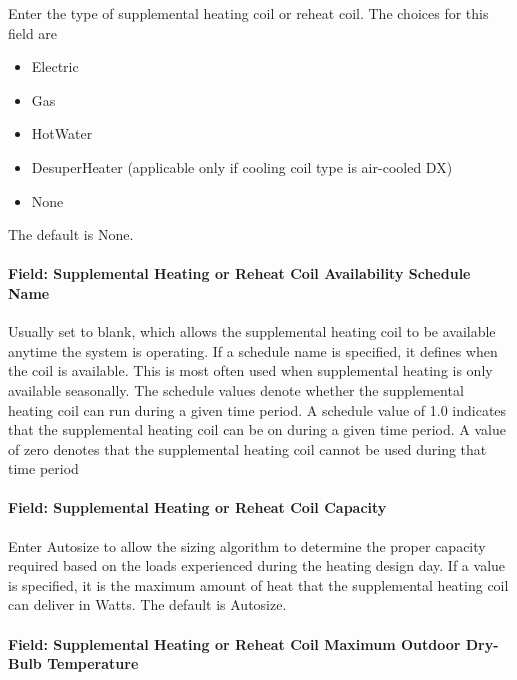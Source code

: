 Enter the type of supplemental heating coil or reheat coil. The choices for this field are

\begin{itemize}
\item
  Electric
\item
  Gas
\item
  HotWater
\item
  DesuperHeater (applicable only if cooling coil type is air-cooled DX)
\item
  None
\end{itemize}

The default is None.

\paragraph{Field: Supplemental Heating or Reheat Coil Availability Schedule Name}\label{field-supplemental-heating-or-reheat-coil-availability-schedule-name}

Usually set to blank, which allows the supplemental heating coil to be available anytime the system is operating. If a schedule name is specified, it defines when the coil is available. This is most often used when supplemental heating is only available seasonally. The schedule values denote whether the supplemental heating coil can run during a given time period. A schedule value of 1.0 indicates that the supplemental heating coil can be on during a given time period. A value of zero denotes that the supplemental heating coil cannot be used during that time period

\paragraph{Field: Supplemental Heating or Reheat Coil Capacity}\label{field-supplemental-heating-or-reheat-coil-capacity}

Enter Autosize to allow the sizing algorithm to determine the proper capacity required based on the loads experienced during the heating design day. If a value is specified, it is the maximum amount of heat that the supplemental heating coil can deliver in Watts. The default is Autosize.

\paragraph{Field: Supplemental Heating or Reheat Coil Maximum Outdoor Dry-Bulb Temperature}\label{field-supplemental-heating-or-reheat-coil-maximum-outdoor-dry-bulb-temperature}

